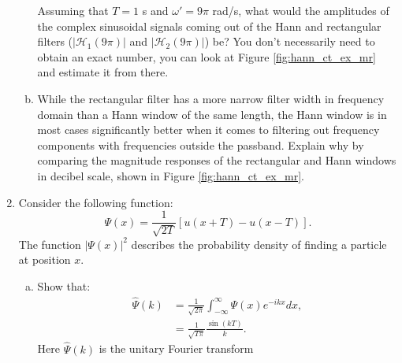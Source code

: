 \begin{enumerate}
\begin{enumerate}[a)]
    Assuming that $T=1$ s and $\omega'=9\pi$ rad/s, what would the
    amplitudes of the complex sinusoidal signals coming out of the 
    Hann and rectangular filters ($|\mathcal{H}_1(9\pi)|$ and
    $|\mathcal{H}_2(9\pi)|$) be? You don't necessarily need to obtain an
    exact number, you can look at Figure \ref{fig:hann_ct_ex_mr} and
    estimate it from there.

    \item While the rectangular filter has a more narrow filter width
    in frequency domain than a Hann window of the same length, the
    Hann window is in most cases significantly better when it comes to
    filtering out frequency components with frequencies outside
    the passband. Explain why by comparing the magnitude responses of
    the rectangular and Hann windows in decibel scale, shown in
    Figure \ref{fig:hann_ct_ex_mr}.
            

      
  \end{enumerate}


\item Consider the following function:
\begin{equation}
\Psi(x) = \frac{1}{\sqrt{2T}}[u(x + T) - u(x - T)].
\end{equation}
The function $|\Psi(x)|^{2}$ describes the probability density of
finding a particle at position $x$.

\begin{enumerate}[a)]
\item Show that:
\begin{align*}
\hat{\Psi}(k)&= \frac{1}{\sqrt{2\pi}}\int_{-\infty}^{\infty}\Psi(x)e^{-ik x}dx, \\
            &= \frac{1}{\sqrt{T\pi}}\frac{\sin(k T)}{k}.
\end{align*}
Here $\hat{\Psi}(k)$ is the unitary Fourier transform
\end{enumerate}
\end{enumerate}

